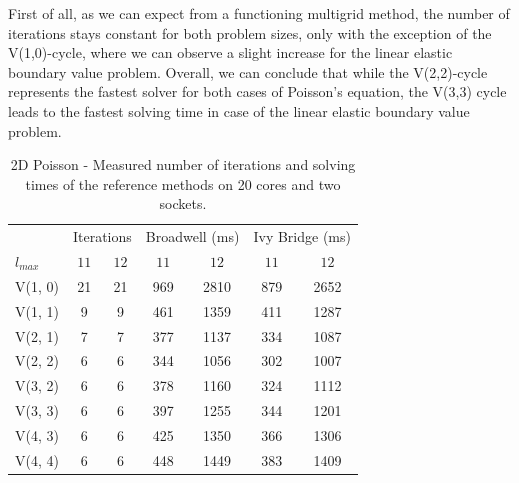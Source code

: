 First of all, as we can expect from a functioning multigrid method, the number of iterations stays constant for both problem sizes, only with the exception of the V(1,0)-cycle, where we can observe a slight increase for the linear elastic boundary value problem.
Overall, we can conclude that while the V(2,2)-cycle represents the fastest solver for both cases of Poisson's equation, the V(3,3) cycle leads to the fastest solving time in case of the linear elastic boundary value problem.
\begin{table}
	\caption{2D Poisson - Measured number of iterations and solving times of the reference methods on 20 cores and two sockets.}
	\label{table:poisson-2D-reference-methods}
	\centering
	\begin{tabular}{l c c c c c c}
		\toprule
		& \multicolumn{2}{c}{Iterations} & \multicolumn{2}{c}{Broadwell (ms)} & \multicolumn{2}{c}{Ivy Bridge (ms)} \\
		\cmidrule(r){2-3} \cmidrule(r){4-5} \cmidrule(r){6-7}
		$l_{max}$ & $11$& $12$ & $11$ & $12$ & $11$ & $12$\\
		\midrule
		V(1, 0) & 21 & 21 & 969 & 2810 & 879 & 2652 \\
		\midrule
		V(1, 1) & 9 & 9 & 461 & 1359 & 411 & 1287 \\
		\midrule
		V(2, 1) & 7 & 7 & 377 & 1137 & 334 & 1087\\
		\midrule
		V(2, 2) & 6 & 6 & 344 & 1056 & 302 & 1007 \\
		\midrule
		V(3, 2) & 6 & 6 & 378 & 1160 & 324 & 1112 \\
		\midrule
		V(3, 3) & 6 & 6 & 397 & 1255 & 344 & 1201 \\
		\midrule
		V(4, 3) & 6 & 6 & 425 & 1350 & 366 & 1306 \\
		\midrule
		V(4, 4) & 6 & 6 & 448 & 1449 & 383 & 1409\\
		\bottomrule
	\end{tabular}
\end{table}
